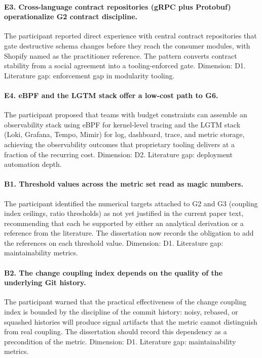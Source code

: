 \paragraph*{E3. Cross-language contract repositories (gRPC plus Protobuf) operationalize G2 contract discipline.} The participant reported direct experience with central contract repositories that gate destructive schema changes before they reach the consumer modules, with Shopify named as the practitioner reference. The pattern converts contract stability from a social agreement into a tooling-enforced gate. Dimension: D1. Literature gap: enforcement gap in modularity tooling.

\paragraph*{E4. eBPF and the LGTM stack offer a low-cost path to G6.} The participant proposed that teams with budget constraints can assemble an observability stack using eBPF for kernel-level tracing and the LGTM stack (Loki, Grafana, Tempo, Mimir) for log, dashboard, trace, and metric storage, achieving the observability outcomes that proprietary tooling delivers at a fraction of the recurring cost. Dimension: D2. Literature gap: deployment automation depth.

\paragraph*{B1. Threshold values across the metric set read as magic numbers.} The participant identified the numerical targets attached to G2 and G3 (coupling index ceilings, ratio thresholds) as not yet justified in the current paper text, recommending that each be supported by either an analytical derivation or a reference from the literature. The dissertation now records the obligation to add the references on each threshold value. Dimension: D1. Literature gap: maintainability metrics.

\paragraph*{B2. The change coupling index depends on the quality of the underlying Git history.} The participant warned that the practical effectiveness of the change coupling index is bounded by the discipline of the commit history: noisy, rebased, or squashed histories will produce signal artifacts that the metric cannot distinguish from real coupling. The dissertation should record this dependency as a precondition of the metric. Dimension: D1. Literature gap: maintainability metrics.


